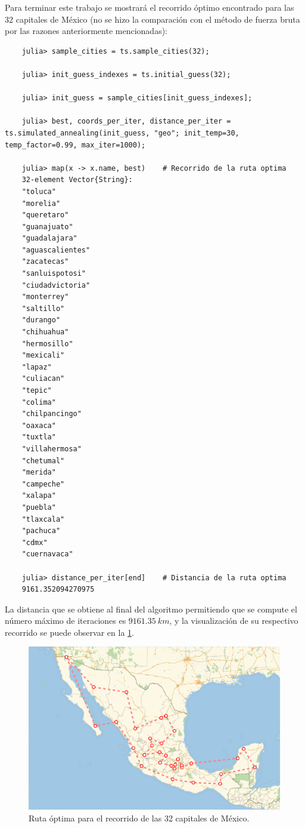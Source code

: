 Para terminar este trabajo se mostrará el recorrido óptimo encontrado para las 32 capitales de México (no se hizo la comparación con el método de fuerza bruta por las razones anteriormente mencionadas):
\begin{verbatim}
    julia> sample_cities = ts.sample_cities(32);

    julia> init_guess_indexes = ts.initial_guess(32);

    julia> init_guess = sample_cities[init_guess_indexes];

    julia> best, coords_per_iter, distance_per_iter = ts.simulated_annealing(init_guess, "geo"; init_temp=30, temp_factor=0.99, max_iter=1000);

    julia> map(x -> x.name, best)    # Recorrido de la ruta optima
    32-element Vector{String}:
    "toluca"
    "morelia"
    "queretaro"
    "guanajuato"
    "guadalajara"
    "aguascalientes"
    "zacatecas"
    "sanluispotosi"
    "ciudadvictoria"
    "monterrey"
    "saltillo"
    "durango"
    "chihuahua"
    "hermosillo"
    "mexicali"
    "lapaz"
    "culiacan"
    "tepic"
    "colima"
    "chilpancingo"
    "oaxaca"
    "tuxtla"
    "villahermosa"
    "chetumal"
    "merida"
    "campeche"
    "xalapa"
    "puebla"
    "tlaxcala"
    "pachuca"
    "cdmx"
    "cuernavaca"

    julia> distance_per_iter[end]    # Distancia de la ruta optima
    9161.352094270975
\end{verbatim}

La distancia que se obtiene al final del algoritmo permitiendo que se compute el número máximo de iteraciones es $9161.35\ km$, y la visualización de su respectivo recorrido se puede observar en la \cref{fig:trip_cities_32_sa}.
\begin{figure}[ht!]
    \centering
    \includegraphics[scale=1.2]{../figures/trip_cities_32_sa.pdf}
    \caption{Ruta óptima para el recorrido de las 32 capitales de México.}
    \label{fig:trip_cities_32_sa}
\end{figure}

